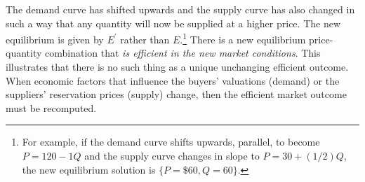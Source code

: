 \newpage
The demand curve has shifted
upwards and the supply curve has also changed in such a way that any
quantity will now be supplied at a higher price. The new equilibrium is
given by $E^{\prime}$ rather than $E$.\footnote{%
For example, if the demand curve shifts upwards, parallel, to become $%
P=120-1Q$ and the supply curve changes in slope to $P=30+(1/2)Q$, the new
equilibrium solution is $\{P=\$60,Q=60\}$.} There is a new equilibrium
price-quantity combination that \textit{is efficient in the new market
conditions}. This illustrates that there is no such thing as a unique
unchanging efficient outcome. When economic factors that influence the
buyers' valuations (demand) or the suppliers' reservation prices (supply)
change, then the efficient market outcome must be recomputed.
